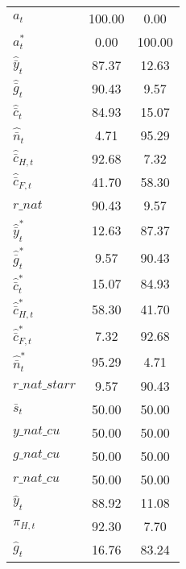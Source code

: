 \begin{center}
\begin{longtable}{lcc}
${a_t}                    $	 & 	            100.00	 & 	              0.00 \\ 
${a_t^*}                  $	 & 	              0.00	 & 	            100.00 \\ 
${\hat {\bar y}_t}        $	 & 	             87.37	 & 	             12.63 \\ 
${\hat {\bar g}_t}        $	 & 	             90.43	 & 	              9.57 \\ 
${\hat {\bar c}_t}        $	 & 	             84.93	 & 	             15.07 \\ 
${\hat {\bar n}_t}        $	 & 	              4.71	 & 	             95.29 \\ 
${\hat {\bar c}_{H,t}}    $	 & 	             92.68	 & 	              7.32 \\ 
${\hat {\bar c}_{F,t}}    $	 & 	             41.70	 & 	             58.30 \\ 
$r\_nat                   $	 & 	             90.43	 & 	              9.57 \\ 
${\hat {\bar y}_t^*}      $	 & 	             12.63	 & 	             87.37 \\ 
${\hat {\bar g}_t^*}      $	 & 	              9.57	 & 	             90.43 \\ 
${\hat {\bar c}_t^*}      $	 & 	             15.07	 & 	             84.93 \\ 
${\hat {\bar c}_{H,t}^*}  $	 & 	             58.30	 & 	             41.70 \\ 
${\hat {\bar c}_{F,t}^*}  $	 & 	              7.32	 & 	             92.68 \\ 
${\hat {\bar n}_t^*}      $	 & 	             95.29	 & 	              4.71 \\ 
$r\_nat\_starr            $	 & 	              9.57	 & 	             90.43 \\ 
${\bar s_t}               $	 & 	             50.00	 & 	             50.00 \\ 
$y\_nat\_cu               $	 & 	             50.00	 & 	             50.00 \\ 
$g\_nat\_cu               $	 & 	             50.00	 & 	             50.00 \\ 
$r\_nat\_cu               $	 & 	             50.00	 & 	             50.00 \\ 
${\hat y_t}               $	 & 	             88.92	 & 	             11.08 \\ 
${\pi_{H,t}}              $	 & 	             92.30	 & 	              7.70 \\ 
${\hat g_t}               $	 & 	             16.76	 & 	             83.24 \\ 

\end{longtable}
\end{center}
